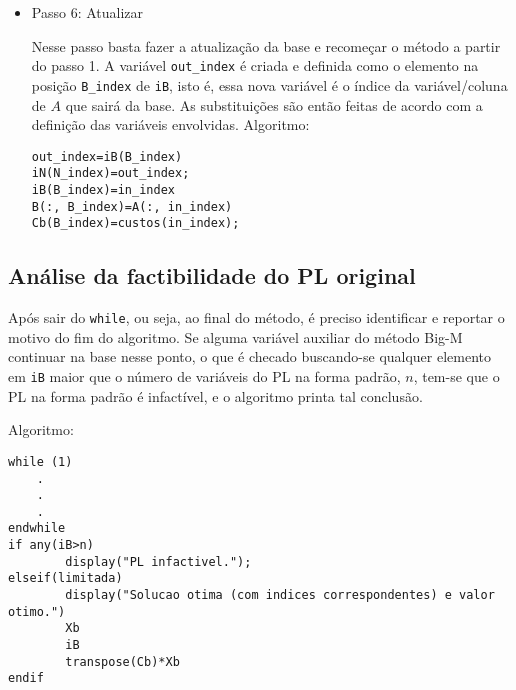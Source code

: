 \documentclass[]{article}
\begin{document}
\begin{itemize}
		\item Passo 6: Atualizar 
		
		Nesse passo basta fazer a atualização da base e recomeçar o método a partir do passo 1. A variável \verb+out_index+ é criada e definida como o elemento na posição \verb+B_index+ de \verb+iB+, isto é, essa nova variável é o índice da variável/coluna de $A$ que sairá da base. As substituições são então feitas de acordo com a definição das variáveis envolvidas. Algoritmo:
\begin{lstlisting}
out_index=iB(B_index)
iN(N_index)=out_index;
iB(B_index)=in_index
B(:, B_index)=A(:, in_index)
Cb(B_index)=custos(in_index);
\end{lstlisting}
\end{itemize}
\subsection{Análise da factibilidade do PL original}
Após sair do \verb+while+, ou seja, ao final do método, é preciso identificar e reportar o motivo do fim do algoritmo. Se alguma variável auxiliar do método Big-M continuar na base nesse ponto, o que é checado buscando-se qualquer elemento em \verb+iB+ maior que o número de variáveis do PL na forma padrão, $n$, tem-se que o PL na forma padrão é infactível, e o algoritmo printa tal conclusão. 

Algoritmo:
\begin{lstlisting}
while (1)
    .
    .
    .
endwhile
if any(iB>n)
        display("PL infactivel.");
elseif(limitada)
        display("Solucao otima (com indices correspondentes) e valor otimo.")
        Xb
        iB
        transpose(Cb)*Xb
endif
\end{lstlisting}
\end{document}
